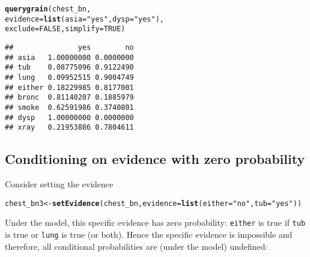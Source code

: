 \documentclass[10pt]{article}\usepackage[]{graphicx}\usepackage[]{xcolor}
\makeatletter
\newcommand{\hlnum}[1]{\textcolor[rgb]{0.686,0.059,0.569}{#1}}%
\newcommand{\hlstr}[1]{\textcolor[rgb]{0.192,0.494,0.8}{#1}}%
\newcommand{\hlstd}[1]{\textcolor[rgb]{0.345,0.345,0.345}{#1}}%
\newcommand{\hlkwb}[1]{\textcolor[rgb]{0.69,0.353,0.396}{#1}}%
\newcommand{\hlkwc}[1]{\textcolor[rgb]{0.333,0.667,0.333}{#1}}%
\newcommand{\hlkwd}[1]{\textcolor[rgb]{0.737,0.353,0.396}{\textbf{#1}}}%
\newenvironment{kframe}{%
 \def\at@end@of@kframe{}%
 \ifinner\ifhmode%
  \def\at@end@of@kframe{\end{minipage}}%
  \begin{minipage}{\columnwidth}%
 \fi\fi%
 \def\FrameCommand##1{\hskip\@totalleftmargin \hskip-\fboxsep
 \colorbox{shadecolor}{##1}\hskip-\fboxsep
     \hskip-\linewidth \hskip-\@totalleftmargin \hskip\columnwidth}%
 \MakeFramed {\advance\hsize-\width
   \@totalleftmargin\z@ \linewidth\hsize
   \@setminipage}}%
 {\par\unskip\endMakeFramed%
 \at@end@of@kframe}
\newenvironment{knitrout}{}{} %
\makeatother
\begin{document}
\begin{enumerate}
\begin{knitrout}
\color{fgcolor}\begin{kframe}
\begin{alltt}
\hlkwd{querygrain}\hlstd{(chest_bn,}
           \hlkwc{evidence}\hlstd{=}\hlkwd{list}\hlstd{(}\hlkwc{asia}\hlstd{=}\hlstr{"yes"}\hlstd{,} \hlkwc{dysp}\hlstd{=}\hlstr{"yes"}\hlstd{),}
           \hlkwc{exclude} \hlstd{=} \hlnum{FALSE}\hlstd{,} \hlkwc{simplify} \hlstd{=} \hlnum{TRUE}\hlstd{)}
\end{alltt}
\begin{verbatim}
##               yes        no
## asia   1.00000000 0.0000000
## tub    0.08775096 0.9122490
## lung   0.09952515 0.9004749
## either 0.18229985 0.8177001
## bronc  0.81140207 0.1885979
## smoke  0.62591986 0.3740801
## dysp   1.00000000 0.0000000
## xray   0.21953886 0.7804611
\end{verbatim}
\end{kframe}
\end{knitrout}


\end{enumerate}



\subsection{Conditioning on evidence with zero probability}
\label{sec:zero-probabilities}

Consider setting the evidence
\begin{knitrout}
\color{fgcolor}\begin{kframe}
\begin{alltt}
\hlstd{chest_bn3} \hlkwb{<-} \hlkwd{setEvidence}\hlstd{(chest_bn,} \hlkwc{evidence}\hlstd{=}\hlkwd{list}\hlstd{(}\hlkwc{either}\hlstd{=}\hlstr{"no"}\hlstd{,} \hlkwc{tub}\hlstd{=}\hlstr{"yes"}\hlstd{))}
\end{alltt}
\end{kframe}
\end{knitrout}

Under the model, this specific evidence has zero probability:
\verb|either| is true if \verb|tub| is true or \verb|lung| is true (or
both). Hence the specific evidence is impossible and therefore, all
conditional probabilities are (under the model) undefined:
\end{document}
